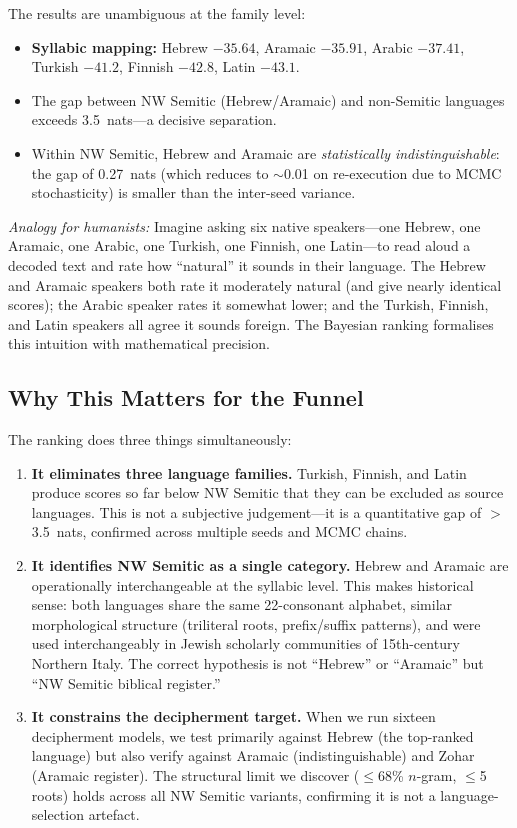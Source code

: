 \documentclass[11pt,a4paper]{article}
\begin{document}
The results are unambiguous at the family level:

\begin{itemize}[nosep]
  \item \textbf{Syllabic mapping:} Hebrew $-35.64$, Aramaic $-35.91$, Arabic $-37.41$, Turkish $-41.2$, Finnish $-42.8$, Latin $-43.1$.
  \item The gap between NW Semitic (Hebrew/Aramaic) and non-Semitic languages exceeds 3.5~nats---a decisive separation.
  \item Within NW Semitic, Hebrew and Aramaic are \emph{statistically indistinguishable}: the gap of 0.27~nats (which reduces to $\sim$0.01 on re-execution due to MCMC stochasticity) is smaller than the inter-seed variance.
\end{itemize}

\textit{Analogy for humanists:} Imagine asking six native speakers---one Hebrew, one Aramaic, one Arabic, one Turkish, one Finnish, one Latin---to read aloud a decoded text and rate how ``natural'' it sounds in their language.  The Hebrew and Aramaic speakers both rate it moderately natural (and give nearly identical scores); the Arabic speaker rates it somewhat lower; and the Turkish, Finnish, and Latin speakers all agree it sounds foreign.  The Bayesian ranking formalises this intuition with mathematical precision.

\subsection{Why This Matters for the Funnel}

The ranking does three things simultaneously:

\begin{enumerate}[nosep]
  \item \textbf{It eliminates three language families.}  Turkish, Finnish, and Latin produce scores so far below NW Semitic that they can be excluded as source languages.  This is not a subjective judgement---it is a quantitative gap of $>$3.5~nats, confirmed across multiple seeds and MCMC chains.
  \item \textbf{It identifies NW Semitic as a single category.}  Hebrew and Aramaic are operationally interchangeable at the syllabic level.  This makes historical sense: both languages share the same 22-consonant alphabet, similar morphological structure (triliteral roots, prefix/suffix patterns), and were used interchangeably in Jewish scholarly communities of 15th-century Northern Italy.  The correct hypothesis is not ``Hebrew'' or ``Aramaic'' but ``NW Semitic biblical register.''
  \item \textbf{It constrains the decipherment target.}  When we run sixteen decipherment models, we test primarily against Hebrew (the top-ranked language) but also verify against Aramaic (indistinguishable) and Zohar (Aramaic register).  The structural limit we discover ($\leq$68\% $n$-gram, $\leq$5 roots) holds across all NW Semitic variants, confirming it is not a language-selection artefact.
\end{enumerate}
\end{document}
